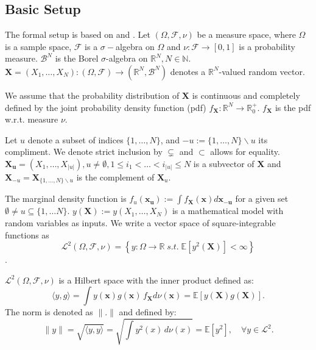 \subsection*{Basic Setup}
The formal setup is based on \cite{chastaing2012} and \cite{rahman2014}. Let $(\Omega, \mathcal{F}, \nu)$ be a measure space, where $\Omega$ is a sample space, $\mathcal{F}$ is a $\sigma-$algebra on $\Omega$ and $\nu: \mathcal{F} \rightarrow [0, 1]$ is a probability measure. $\mathcal{B}^N$ is the Borel $\sigma$-algebra on $\mathbb{R}^N, N \in \mathbb{N}$.
$\boldsymbol{X} = (X_1, \dots, X_N): (\Omega, \mathcal{F}) \rightarrow (\mathbb{R}^N, \mathcal{B}^N)$ denotes a $\mathbb{R}^N$-valued random vector.\par
We assume that the probability distribution of $\boldsymbol{X}$ is continuous and completely defined by the joint probability density function (pdf) $f_{\boldsymbol{X}}: \mathbb{R}^N \rightarrow \mathbb{R}_{0}^+$. $f_{\boldsymbol{X}}$ is the pdf w.r.t. measure $\nu$. \par

Let $u$ denote a subset of indices $\{1, \dots, N\}$, and $-u := \{1, \dots, N\} \backslash{} u$ its compliment. We denote strict inclusion by $\subsetneq$ and $\subset$ allows for equality.
$\boldsymbol{X_u} = (X_1, \dots, X_{|u|}), u \neq \emptyset, 1 \leq i_1 < \dots < i_{|u|} \leq N$ is a subvector of $\boldsymbol{X}$ and $\boldsymbol{X}_{-u} = \boldsymbol{X}_{\{1, \dots, N\} \backslash{} u}$ is the complement of $\boldsymbol{X}_u$.\par

The marginal density function is $f_u(\boldsymbol{x_u}) := \int f_{\boldsymbol{X}}(\boldsymbol{x})d\boldsymbol{x_{-u}}$ for a given set $\emptyset \neq u \subseteq \{1, \dots N\}$.
$y(\boldsymbol{X}) := y(X_1, \dots, X_N)$ is a mathematical model with random variables as inputs.
We write a vector space of square-integrable functions as
\[\mathcal{L}^2(\Omega, \mathcal{F}, \nu) = \left\{ y: \Omega \rightarrow \mathbb{R} \; \textit{s.t.} \; \mathbb{E}[y^2(\boldsymbol{X})] < \infty \right\}\].

$\mathcal{L}^2(\Omega, \mathcal{F}, \nu)$ is a Hilbert space with the inner product defined as:
\[
\langle y, g \rangle = \int y(\boldsymbol{x}) g(\boldsymbol{x}) \, f_{\boldsymbol{X}}d\nu(\boldsymbol{x}) = \mathbb{E}[y(\boldsymbol{X})g(\boldsymbol{X})].
\]
The norm is denoted as $\|.\| $ and defined by:
\[
\|y\| = \sqrt{\langle y, y \rangle} = \sqrt{\int y^2(x) \, d\nu(x)} = \mathbb{E}[y^2], \quad \forall y \in \mathcal{L}^2.
\]

